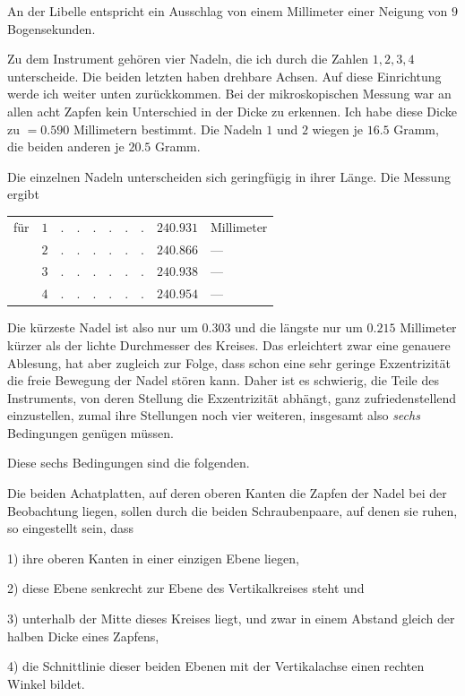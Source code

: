 An der Libelle entspricht ein Ausschlag von einem Millimeter einer Neigung von $9$ Bogensekunden.

Zu dem Instrument gehören vier Nadeln, die ich durch die Zahlen $1,2,3,4$ unterscheide. Die beiden letzten haben drehbare Achsen. Auf diese Einrichtung werde ich weiter unten zurückkommen. Bei der mikroskopischen Messung war an allen acht Zapfen kein Unterschied in der Dicke zu erkennen. Ich habe diese Dicke zu $=0.590$ Millimetern bestimmt. Die Nadeln $1$ und $2$ wiegen je $16.5$ Gramm, die beiden anderen je $20.5$ Gramm.

Die einzelnen Nadeln unterscheiden sich geringfügig in ihrer Länge. Die Messung ergibt
\begin{center}
\begin{tabular}{crcrl}
für &$1$&$.\quad.\quad.\quad.\quad.\quad.$&$240.931$&Millimeter\\
&$2$&$.\quad.\quad.\quad.\quad.\quad.$&$240.866$&—\\
&$3$&$.\quad.\quad.\quad.\quad.\quad.$&$240.938$&—\\
&$4$&$.\quad.\quad.\quad.\quad.\quad.$&$240.954$&—
\end{tabular}
\end{center}
Die kürzeste Nadel ist also nur um $0.303$ und die längste nur um $0.215$ Millimeter kürzer als der lichte Durchmesser des Kreises. Das erleichtert zwar eine genauere Ablesung, hat aber zugleich zur Folge, dass schon eine sehr geringe Exzentrizität die freie Bewegung der Nadel stören kann. Daher ist es schwierig, die Teile des Instruments, von deren Stellung die Exzentrizität abhängt, ganz zufriedenstellend einzustellen, zumal ihre Stellungen noch vier weiteren, insgesamt also \textit{sechs} Bedingungen genügen müssen.

Diese sechs Bedingungen sind die folgenden.

Die beiden Achatplatten, auf deren oberen Kanten die Zapfen der Nadel bei der Beobachtung liegen, sollen durch die beiden Schraubenpaare, auf denen sie ruhen, so eingestellt sein, dass

1) ihre oberen Kanten in einer einzigen Ebene liegen,

2) diese Ebene senkrecht zur Ebene des Vertikalkreises steht und

3) unterhalb der Mitte dieses Kreises liegt, und zwar in einem Abstand gleich der halben Dicke eines Zapfens,

4) die Schnittlinie dieser beiden Ebenen mit der Vertikalachse einen rechten Winkel bildet.


